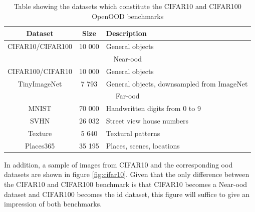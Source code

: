\documentclass[UKenglish]{uiomasterthesis} %
\theoremstyle{definition}
\begin{document}
\begin{table}[H]
\begin{center}
\begin{tabular}{ |c|c|l| } 
    \hline
    Dataset & Size & Description \\
    \hline
    \rowcolor{id!50}
    CIFAR10/CIFAR100 & 10 000 & General objects \\ 
    \hline
    \hline
    \multicolumn{3}{|c|}{Near-\ac{ood}} \\
    \hline
    \rowcolor{near!50}
    CIFAR100/CIFAR10 & 10 000 & General objects \\ 
    \rowcolor{near!50}
    TinyImageNet & 7 793 & General objects, downsampled from ImageNet \\ 
    \hline
    \hline
    \multicolumn{3}{|c|}{Far-\ac{ood}} \\
    \hline
    \rowcolor{far!50}
    MNIST & 70 000 & Handwritten digits from 0 to 9 \\ 
    \rowcolor{far!50}
    SVHN & 26 032 & Street view house numbers \\ 
    \rowcolor{far!50}
    Texture & 5 640 & Textural patterns \\ 
    \rowcolor{far!50}
    Places365 & 35 195 & Places, scenes, locations \\ 
    \hline
    \end{tabular}
    \caption[CIFAR benchmark datasets]{Table showing the datasets which constitute the CIFAR10 and CIFAR100 OpenOOD benchmarks}
    \label{table:cifar10}
\end{center}
\end{table}

In addition, a sample of images from CIFAR10 and the corresponding \ac{ood} datasets are shown in figure \ref{fig:cifar10}. Given that the only difference between the CIFAR10 and CIFAR100 benchmark is that CIFAR10 becomes a Near-\ac{ood} dataset and CIFAR100 becomes the \ac{id} dataset, this figure will suffice to give an impression of both benchmarks.
\end{document}
